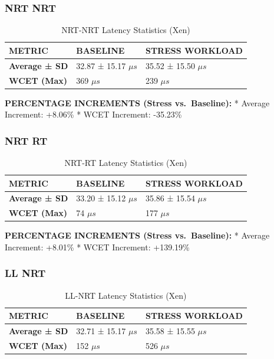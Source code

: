 \subsubsection{NRT NRT}\label{nrt-nrt-1}

\begin{table}
\centering
\caption{NRT-NRT Latency Statistics (Xen)}
\label{tab:xen:nrt-nrt}
\begin{tabularx}{\linewidth}{@{}YYY@{}}
\toprule
METRIC & BASELINE & STRESS WORKLOAD\tabularnewline
\midrule
\textbf{Average ± SD} & 32.87 ± 15.17 $\mu s$ & 35.52 ± 15.50 $\mu s$\tabularnewline
\textbf{WCET (Max)} & 369 $\mu s$ & 239 $\mu s$\tabularnewline
\bottomrule
\end{tabularx}
\end{table}

\textbf{PERCENTAGE INCREMENTS (Stress vs.~Baseline):} * Average
Increment: +8.06\% * WCET Increment: -35.23\%

\subsubsection{NRT RT}\label{nrt-rt-1}

\begin{table}
\centering
\caption{NRT-RT Latency Statistics (Xen)}
\label{tab:xen:nrt-rt}
\begin{tabularx}{\linewidth}{@{}YYY@{}}
\toprule
METRIC & BASELINE & STRESS WORKLOAD\tabularnewline
\midrule
\textbf{Average ± SD} & 33.20 ± 15.12 $\mu s$ & 35.86 ± 15.54 $\mu s$\tabularnewline
\textbf{WCET (Max)} & 74 $\mu s$ & 177 $\mu s$\tabularnewline
\bottomrule
\end{tabularx}
\end{table}

\textbf{PERCENTAGE INCREMENTS (Stress vs.~Baseline):} * Average
Increment: +8.01\% * WCET Increment: +139.19\%

\subsubsection{LL NRT}\label{ll-nrt}

\begin{table}
\centering
\caption{LL-NRT Latency Statistics (Xen)}
\label{tab:xen:ll-nrt}
\begin{tabularx}{\linewidth}{@{}YYY@{}}
\toprule
METRIC & BASELINE & STRESS WORKLOAD\tabularnewline
\midrule
\textbf{Average ± SD} & 32.71 ± 15.17 $\mu s$ & 35.58 ± 15.55 $\mu s$\tabularnewline
\textbf{WCET (Max)} & 152 $\mu s$ & 526 $\mu s$\tabularnewline
\bottomrule
\end{tabularx}
\end{table}

